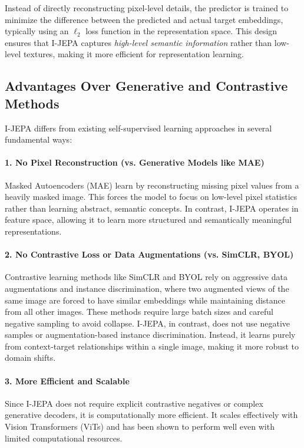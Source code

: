 \documentclass{article}
\begin{document}
Instead of directly reconstructing pixel-level details, the predictor is trained to minimize the difference between the predicted and actual target embeddings, typically using an $\ell_2$ loss function in the representation space. This design ensures that I-JEPA captures \textit{high-level semantic information} rather than low-level textures, making it more efficient for representation learning.

\subsection{Advantages Over Generative and Contrastive Methods}
I-JEPA differs from existing self-supervised learning approaches in several fundamental ways:

\paragraph{1. No Pixel Reconstruction (vs. Generative Models like MAE)} Masked Autoencoders (MAE) \citep{he2022masked} learn by reconstructing missing pixel values from a heavily masked image. This forces the model to focus on low-level pixel statistics rather than learning abstract, semantic concepts. In contrast, I-JEPA operates in feature space, allowing it to learn more structured and semantically meaningful representations.

\paragraph{2. No Contrastive Loss or Data Augmentations (vs. SimCLR, BYOL)} Contrastive learning methods like SimCLR \citep{chen2020simple} and BYOL \citep{grill2020bootstrap} rely on aggressive data augmentations and instance discrimination, where two augmented views of the same image are forced to have similar embeddings while maintaining distance from all other images. These methods require large batch sizes and careful negative sampling to avoid collapse. I-JEPA, in contrast, does not use negative samples or augmentation-based instance discrimination. Instead, it learns purely from context-target relationships within a single image, making it more robust to domain shifts.

\paragraph{3. More Efficient and Scalable} Since I-JEPA does not require explicit contrastive negatives or complex generative decoders, it is computationally more efficient. It scales effectively with Vision Transformers (ViTs) and has been shown to perform well even with limited computational resources. 
\end{document}
